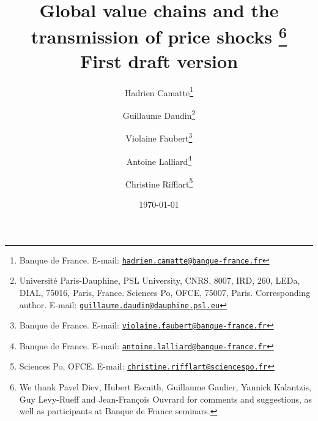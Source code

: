 \documentclass[11pt,a4paper]{article}
\newcommand{\email}[1]{\href{mailto:#1}{\nolinkurl{#1}}}
\begin{document}
\title{Global value chains and the transmission of price shocks			\thanks{We thank Pavel Diev, Hubert Escaith, Guillaume Gaulier, Yannick Kalantzis, Guy Levy-Rueff and Jean-François Ouvrard for comments and suggestions, as well as participants at Banque de France seminars.}\\
\vspace{1cm}
\normalsize{First draft version}
}
\vspace{1cm}
\date{\today}
\author{
	Hadrien Camatte\thanks{Banque de France. E-mail: \email{hadrien.camatte@banque-france.fr}}
	\and
	Guillaume Daudin\thanks{Université Paris-Dauphine, PSL University, CNRS, 8007, IRD, 260, LEDa, DIAL, 75016, Paris, France. Sciences Po, OFCE, 75007, Paris. Corresponding author. E-mail: \email{guillaume.daudin@dauphine.psl.eu}}
	\and
	Violaine Faubert\thanks{Banque de France. E-mail: \email{violaine.faubert@banque-france.fr}}
	\and
	Antoine Lalliard\thanks{Banque de France. E-mail: \email{antoine.lalliard@banque-france.fr}}
	\and
	Christine Rifflart\thanks{Sciences Po, OFCE. E-mail: \email{christine.rifflart@sciencespo.fr}}
}
\maketitle
\end{document}
